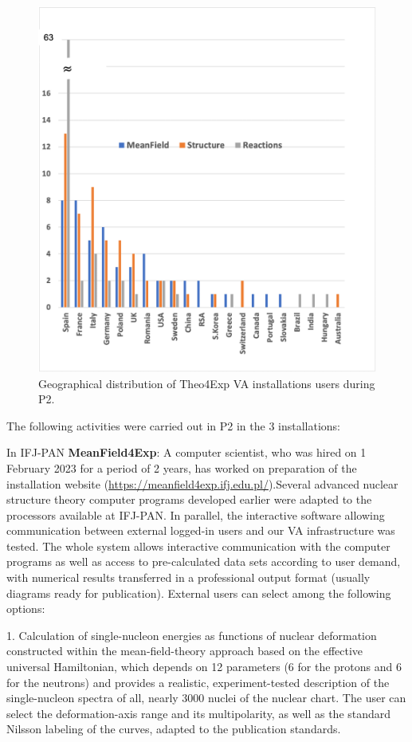 \begin{figure}[!h]
    \centering
    \includegraphics[width=0.85\linewidth]{graphics/VA_countries.png}
    \caption{Geographical distribution of Theo4Exp VA installations users during P2.}
    \label{fig:VA_countries}
\end{figure}
The following activities were carried out in P2 in the 3 installations:

In IFJ-PAN \textbf{MeanField4Exp}: A computer scientist, who was hired on 1 February 2023 for a period of 2 years, has worked on preparation of the installation website (\url{https://meanfield4exp.ifj.edu.pl/}).Several advanced nuclear structure theory computer programs developed earlier were adapted to the processors available at IFJ-PAN. In parallel, the interactive software allowing communication between external logged-in users and our VA infrastructure was tested. The whole system allows interactive communication with the computer programs as well as access to pre-calculated data sets according to user demand, with numerical results transferred in a professional output format (usually diagrams ready for publication). External users can select among the following options:

1. Calculation of single-nucleon energies as functions of nuclear deformation constructed within the mean-field-theory approach based on the effective universal Hamiltonian, which depends on 12 parameters (6 for the protons and 6 for the neutrons) and provides a realistic, experiment-tested description of the single-nucleon spectra of all, nearly 3000 nuclei of the nuclear chart. The user can select the deformation-axis range and its multipolarity, as well as the standard Nilsson labeling of the curves, adapted to the publication standards.

